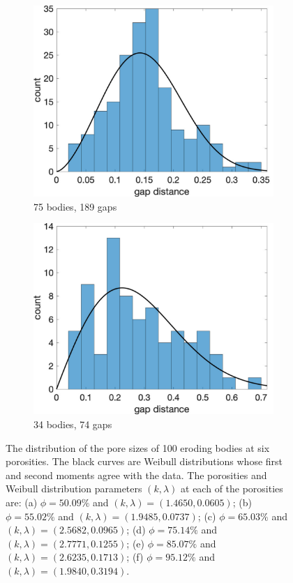 \documentclass[preprint,10pt]{elsarticle}
\begin{document}
\begin{figure}[H]
\begin{subfigure}[b]{0.3\textwidth}
\includegraphics*[width =\linewidth]{./figs/hist100b_207}
\caption{75 bodies, 189 gaps}
\end{subfigure}%
\begin{subfigure}[b]{0.3\textwidth}
\includegraphics*[width =\linewidth]{./figs/hist100b_246}
\caption{34 bodies, 74 gaps}
\end{subfigure}
\caption{\label{fig:Eroding100gap_hist} The distribution of the pore
sizes of 100 eroding bodies at six porosities. The black curves are
Weibull distributions whose first and second moments agree with the
data. The porosities and Weibull distribution parameters $(k,\lambda)$
at each of the porosities are: (a) $\phi = 50.09\%$ and
$(k,\lambda)=(1.4650,0.0605)$; (b) $\phi = 55.02\%$ and
$(k,\lambda)=(1.9485,0.0737)$; (c) $\phi = 65.03\%$ and
$(k,\lambda)=(2.5682,0.0965)$; (d) $\phi = 75.14\%$ and
$(k,\lambda)=(2.7771,0.1255)$; (e) $\phi = 85.07\%$ and
$(k,\lambda)=(2.6235,0.1713)$; (f) $\phi = 95.12\%$ and
$(k,\lambda)=(1.9840, 0.3194)$.}
\end{figure}
\end{document}

